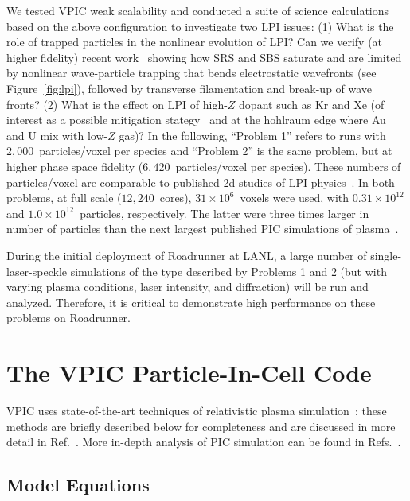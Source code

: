 \documentclass[journal,twoside]{IEEEtran}
\newcommand{\fig}[1]{Figure~\ref{fig:#1}}
\begin{document}
We tested VPIC weak scalability and conducted a suite of science
calculations~\cite{AAC_Conference_Paper} based on the above
configuration to investigate two LPI issues: (1) What is the role
of trapped particles in the nonlinear evolution of LPI?  Can we verify
(at higher fidelity) recent
work~\cite{Yin_et_al_PRL_2007_SRS,Yin_et_al_Phys_Plasmas_2007_SRS}
showing how SRS and SBS saturate and are limited by nonlinear
wave-particle trapping that bends electrostatic wavefronts (see
\fig{lpi}), followed by transverse filamentation and break-up
of wave fronts?  (2) What is the effect on LPI of high-$Z$ dopant such
as Kr and Xe (of interest as a possible mitigation
stategy~\cite{Lushnikov_PPCF_2006} and at the hohlraum edge where Au
and U mix with low-$Z$ gas)?  In the following, ``Problem 1'' refers
to runs with $2,000$~particles/voxel per species and ``Problem 2'' is
the same problem, but at higher phase space fidelity
($6,420$~particles/voxel per species).  These numbers of
particles/voxel are comparable to published 2d studies of LPI
physics~\cite{Yin_et_al_PRL_2007_SRS,Yin_et_al_Phys_Plasmas_2007_SRS}.
In both problems, at full scale ($12,240$~cores), $31 \times
10^6$~voxels were used, with $0.31 \times 10^{12}$ and $1.0 \times
10^{12}$~particles, respectively.  The latter were three times larger
in number of particles than the next largest published PIC simulations
of plasma~\cite{Yin_et_al_PRL_2007_reconnection}.

During the initial deployment of Roadrunner at LANL, a large number of
single-laser-speckle simulations of the type described by Problems 1
and 2 (but with varying plasma conditions, laser intensity, and
diffraction) will be run and analyzed.  Therefore, it is critical to
demonstrate high performance on these problems on Roadrunner.

\section{The VPIC Particle-In-Cell Code}

VPIC uses state-of-the-art techniques of relativistic plasma
simulation~\cite{Blahovec_et_al_2000,Eastwood_et_al_1995,
Jones_et_al_1996,Kwan_Snell_1985,Nieter_Cary_2004,
Verboncoeur_et_al_1995}; these methods are briefly described below for
completeness and are discussed in more detail in
Ref.~\cite{Bowers_et_al_Phys_Plasmas_2007}.  More in-depth analysis of
PIC simulation can be found in
Refs.~\cite{Birdsall_Langdon_1985,Hockney_Eastwood_1988}.

\subsection{Model Equations}
\end{document}
